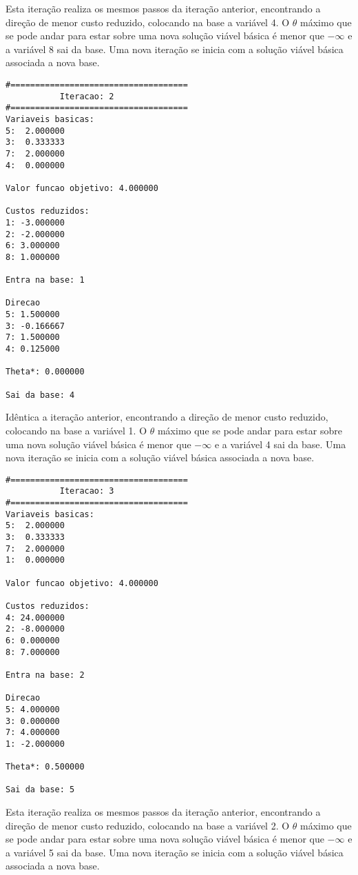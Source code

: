 \documentclass[
	12pt,				%
	openright,			%
	oneside,			%
	a4paper,			%
	english,			%
	french,				%
	spanish,			%
	brazil,				%
	]{abntex2}
\begin{document}
Esta iteração realiza os mesmos passos da iteração anterior, encontrando a direção de menor custo reduzido, colocando na base a variável 4. O $\theta$ máximo que se pode andar para estar sobre uma nova solução viável básica é menor que $-\infty$ e a variável 8 sai da base.
Uma nova iteração se inicia com a solução viável básica associada a nova base.

\begin{verbatim}
#====================================
           Iteracao: 2
#====================================
Variaveis basicas:
5:  2.000000
3:  0.333333
7:  2.000000
4:  0.000000

Valor funcao objetivo: 4.000000

Custos reduzidos:
1: -3.000000
2: -2.000000
6: 3.000000
8: 1.000000

Entra na base: 1

Direcao
5: 1.500000
3: -0.166667
7: 1.500000
4: 0.125000

Theta*: 0.000000

Sai da base: 4
\end{verbatim}

Idêntica a iteração anterior, encontrando a direção de menor custo reduzido, colocando na base a variável 1. O $\theta$ máximo que se pode andar para estar sobre uma nova solução viável básica é menor que $-\infty$ e a variável 4 sai da base.
Uma nova iteração se inicia com a solução viável básica associada a nova base.

\begin{verbatim}
#====================================
           Iteracao: 3
#====================================
Variaveis basicas:
5:  2.000000
3:  0.333333
7:  2.000000
1:  0.000000

Valor funcao objetivo: 4.000000

Custos reduzidos:
4: 24.000000
2: -8.000000
6: 0.000000
8: 7.000000

Entra na base: 2

Direcao
5: 4.000000
3: 0.000000
7: 4.000000
1: -2.000000

Theta*: 0.500000

Sai da base: 5
\end{verbatim}

Esta iteração realiza os mesmos passos da iteração anterior, encontrando a direção de menor custo reduzido, colocando na base a variável 2. O $\theta$ máximo que se pode andar para estar sobre uma nova solução viável básica é menor que $-\infty$ e a variável 5 sai da base.
Uma nova iteração se inicia com a solução viável básica associada a nova base.
\end{document}
